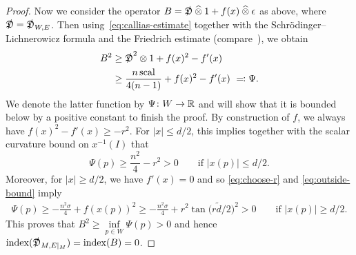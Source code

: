 \documentclass[11pt]{article}
\numberwithin{equation}{section}
\begin{document}
\begin{proof}
 Now we consider the operator
 \(
 B = \slashed{\mathfrak{D}} \mathbin{\widehat{\otimes}} 1 + f(x) \mathbin{\widehat{\otimes}} \epsilon
 \)
 as above, where \(\slashed{\mathfrak{D}} = \slashed{\mathfrak{D}}_{W,E}\).
 Then \linebreak using~\eqref{eq:callias-estimate} together with the Schr\"odinger--Lichnerowicz formula and the Friedrich estimate (compare~\cite[Section~3.2]{Cecchini:LongNeck}), we obtain
 \begin{align*}
 B^2 &\geq \slashed{\mathfrak{D}}^2 \otimes 1 + f(x)^2 - f'(x) \\
 &\geq {\frac{n \operatorname{scal}}{4(n-1)} + f(x)^2 - f'(x)}\ \eqqcolon \Psi.
 \end{align*}
 We denote the latter function by \(\Psi \colon W \to \mathbb{R}\) and will show that it is bounded below by a positive constant to finish the proof.
 By construction of \(f\), we always have \(f(x)^2 - f'(x) \geq -r^2\).
 For \(|x| \leq d/2\), this implies together with the scalar curvature bound on \(x^{-1}(I)\) that
 \[
 \Psi(p) \geq \frac{n^2}{4} - r^2 > 0 \qquad \text{if \(|x(p)| \leq d/2\).}
 \]
 Moreover, for \(|x| \geq d/2\), we have \(f'(x) = 0\) and so \eqref{eq:choose-r} and \eqref{eq:outside-bound} imply
 \begin{align*}
\Psi(p) \geq - \frac{n^2 \sigma}{4} + f(x(p))^2 \geq - \frac{n^2 \sigma}{4} + r^2 \tan\big(r \tilde{d} / 2\big)^2 > 0 \qquad \text{if \(|x(p)| \geq d/2\).}
 \end{align*}
 This proves that \(B^2 \geq \inf\limits_{p \in W} \Psi(p) > 0\) and hence \(\operatorname{index}(\slashed{\mathfrak{D}}_{M, E|_M}) = \operatorname{index}(B) = 0\).
 \end{proof}
\end{document}
